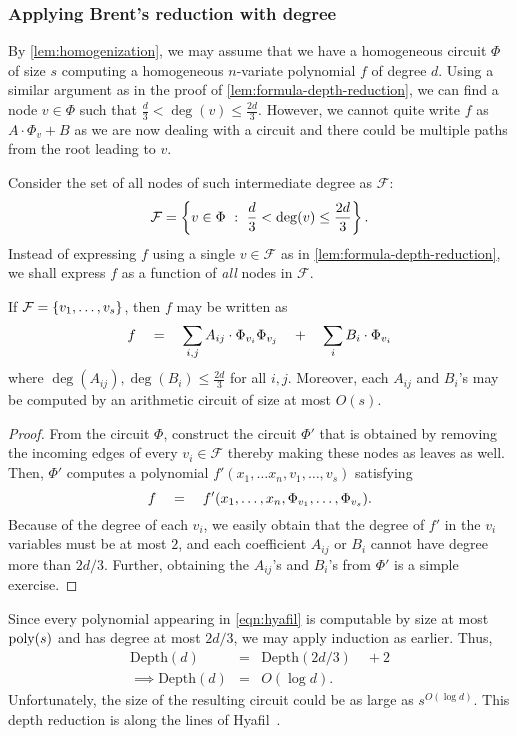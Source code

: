 \subsubsection{Applying Brent's reduction with degree}

By \autoref{lem:homogenization}, we may assume that we have a homogeneous circuit $\Phi$ of size $s$ computing a homogeneous $n$-variate polynomial $f$ of degree $d$.
Using a similar argument as in the proof of \autoref{lem:formula-depth-reduction}, we can find a node $v \in \Phi$ such that $\frac{d}{3} < \deg(v) \leq \frac{2d}{3}$. 
However, we cannot quite write $f$ as $A \cdot \Phi_v + B$ as we are now dealing with a circuit and there could be multiple paths from the root leading to $v$.

Consider the set of all nodes of such intermediate degree as $\mathcal{F}$:
\[
\mathcal{F} = \left\{{v\in \Phi}\ : \ {\frac{d}{3} < \deg(v)\leq \frac{2d}{3}}\right\}.
\]
Instead of expressing $f$ using a single $v\in \mathcal{F}$ as in \autoref{lem:formula-depth-reduction}, we shall express $f$ as a function of \emph{all} nodes in $\mathcal{F}$. 

\begin{claim}
If $\mathcal{F} = \left\{v_1,\dots, v_s\right\}$, then $f$ may be written as
\begin{equation}\label{eqn:hyafil}
f \quad = \quad \sum_{i,j} A_{ij} \cdot \Phi_{v_i} \Phi_{v_j} \quad + \quad \sum_i B_i \cdot \Phi_{v_i}
\end{equation}
where $\deg(A_{ij}), \deg(B_i) \leq \frac{2d}{3}$ for all $i,j$. 
Moreover, each $A_{ij}$ and $B_i$'s may be computed by an arithmetic circuit of size at most $O(s)$. 
\end{claim}
\begin{proof}
From the circuit $\Phi$, construct the circuit $\Phi'$ that is obtained by removing the incoming edges of every $v_i \in \mathcal{F}$ thereby making these nodes as leaves as well. 
Then, $\Phi'$ computes a polynomial $f'(x_1,\dots x_n, v_1,\dots, v_s)$ satisfying 
\[
f \quad = \quad f'(x_1,\dots, x_n, \Phi_{v_1},\dots, \Phi_{v_s}).
\]
Because of the degree of each $v_i$, we easily obtain that the degree of $f'$ in the $v_i$ variables must be at most $2$, and each coefficient $A_{ij}$ or $B_i$ cannot have degree more than $2d/3$. 
Further, obtaining the $A_{ij}$'s and $B_i$'s from $\Phi'$ is a simple exercise. 
\end{proof}

Since every polynomial appearing in \eqref{eqn:hyafil} is computable by size at most $\operatorname{poly}(s)$ and has degree at most $2d/3$, we may apply induction as earlier. 
Thus,
\begin{eqnarray*}
\mathrm{Depth}(d) & = & \mathrm{Depth}(2d/3) \quad + 2\\
\implies \mathrm{Depth}(d) & = & O(\log d).
\end{eqnarray*}
Unfortunately, the size of the resulting circuit could be as large as $s^{O(\log d)}$. 
This depth reduction is along the lines of Hyafil~\cite{Hyafil1978}.


